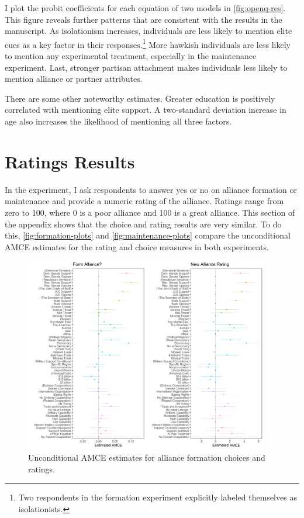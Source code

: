 \documentclass[12pt]{article}
\begin{document}
I plot the probit coefficients for each equation of two models in \autoref{fig:openq-res}. 
This figure reveals further patterns that are consistent with the results in the manuscript.
As isolationism increases, individuals are less likely to mention elite cues as a key factor in their responses.\footnote{Two respondents in the formation experiment explicitly labeled themselves as isolationists.} 
More hawkish individuals are less likely to mention any experimental treatment, especially in the maintenance experiment. 
Last, stronger partisan attachment makes individuals less likely to mention alliance or partner attributes. 


There are some other noteworthy estimates.
Greater education is positively correlated with mentioning elite support. 
A two-standard deviation increase in age also increases the likelihood of mentioning all three factors. 


\newpage


\section{Ratings Results}

In the experiment, I ask respondents to answer yes or no on alliance formation or maintenance and provide a numeric rating of the alliance. 
Ratings range from zero to 100, where 0 is a poor alliance and 100 is a great alliance. 
This section of the appendix shows that the choice and rating results are very similar. 
To do this, \autoref{fig:formation-plots} and \autoref{fig:maintenance-plots} compare the unconditional AMCE estimates for the rating and choice measures in both experiments.  


\begin{figure}
	\centering
		\includegraphics[width=0.95\textwidth]{formation-plots.png}
	\caption{Unconditional AMCE estimates for alliance formation choices and ratings.}
	\label{fig:formation-plots}
\end{figure}
\end{document}
